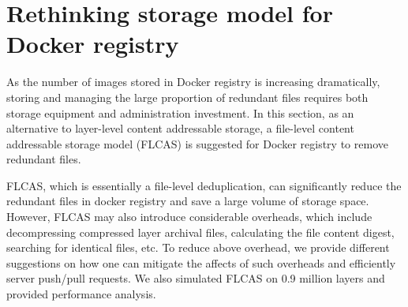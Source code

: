 \section{Rethinking storage model for Docker registry}
\label{sec:file_adressable}
%
%
As the number of images stored in Docker registry is increasing dramatically,
storing and managing the large proportion of redundant files requires both
storage equipment and administration investment.  In this section, as an
alternative to layer-level content addressable storage, a file-level content
addressable storage model (FLCAS) is suggested for Docker registry to remove
redundant files.%

FLCAS, which is essentially a file-level deduplication, can significantly
reduce the redundant files in docker registry and save a large volume of
storage space. However, FLCAS may also introduce considerable overheads, which
include decompressing compressed layer archival files, calculating the file
content digest, searching for identical files, etc.  To reduce above overhead,
we provide different suggestions on how one can mitigate the affects of such
overheads and efficiently server push/pull requests. We also simulated FLCAS on
0.9 million layers and provided performance analysis.


